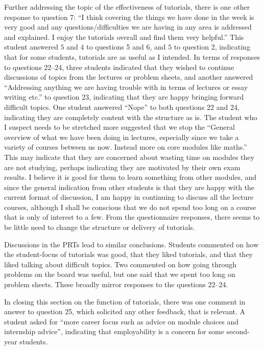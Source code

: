 Further addressing the topic of the effectiveness of tutorials, there is one other response to question 7: ``I think covering the things we have done in the week is very good and any questions/difficulties we are having in any area is addressed and explained. I enjoy the tutorials overall and find them very helpful.'' This student answered $5$ and $4$ to questions 5 and 6, and $5$ to question 2, indicating that for some students, tutorials are as useful as I intended. In terms of responses to questions 22--24, three students indicated that they wished to continue discussions of topics from the lectures or problem sheets, and another answered ``Addressing anything we are having trouble with in terms of lectures or essay writing etc.'' to question 23, indicating that they are happy bringing forward difficult topics. One student answered ``Nope'' to both questions 22 and 24, indicating they are completely content with the structure as is. The student who I suspect needs to be stretched more suggested that we stop the ``General overview of what we have been doing in lectures, especially since we take a variety of courses between us now. Instead more on core modules like maths.'' This may indicate that they are concerned about wasting time on modules they are not studying, perhaps indicating they are motivated by their own exam results. I believe it is good for them to learn something from other modules, and since the general indication from other students is that they are happy with the current format of discussion, I am happy in continuing to discuss all the lecture courses, although I shall be conscious that we do not spend too long on a course that is only of interest to a few. From the questionnaire responses, there seems to be little need to change the structure or delivery of tutorials.

Discussions in the PRTs lead to similar conclusions. Students commented on how the student-focus of tutorials was good, that they liked tutorials, and that they liked talking about difficult topics. Two commented on how going through problems on the board was useful, but one said that we spent too long on problem sheets. These broadly mirror responses to the questions 22--24.

In closing this section on the function of tutorials, there was one comment in answer to question 25, which solicited any other feedback, that is relevant. A student asked for ``more career focus such as advice on module choices and internship advice'', indicating that employability is a concern for some second-year students.

